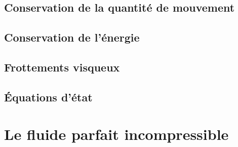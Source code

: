 \documentclass[%
	final, %
	 10pt, %
 	compress, %
hyperref={bookmarks=true}	
]{beamer}
\begin{document}
\subsection{Conservation de la quantité de mouvement}
\label{sec:conservation-de-la-1}

\subsection{Conservation de l'énergie}
\label{sec:cons-de-lenerg}

\subsection{Frottements visqueux}
\label{sec:frottements-visqueux}

\subsection{Équations d'état}
\label{sec:equations-detat}

\section{Le fluide parfait incompressible}
\label{sec:le-fluide-parfait}
\end{document}
